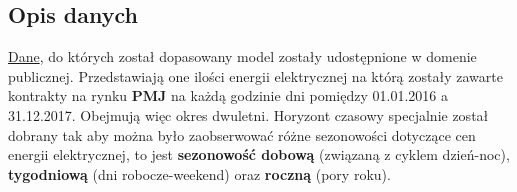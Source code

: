 \documentclass{article}
\begin{document}
\subsection{Opis danych}
\href{https://www.kaggle.com/datasets/robikscube/hourly-energy-consumption}{Dane}, do których został dopasowany model zostały udostępnione w domenie publicznej. Przedstawiają one ilości energii elektrycznej na którą zostały zawarte kontrakty na rynku \textbf{PMJ} na każdą godzinie dni pomiędzy 01.01.2016 a 31.12.2017. Obejmują więc okres dwuletni. Horyzont czasowy specjalnie został dobrany tak aby można było zaobserwować różne sezonowości dotyczące cen energii elektrycznej, to jest \textbf{sezonowość dobową} (związaną z cyklem dzień-noc), \textbf{tygodniową} (dni robocze-weekend) oraz \textbf{roczną} (pory roku). 
\end{document}
